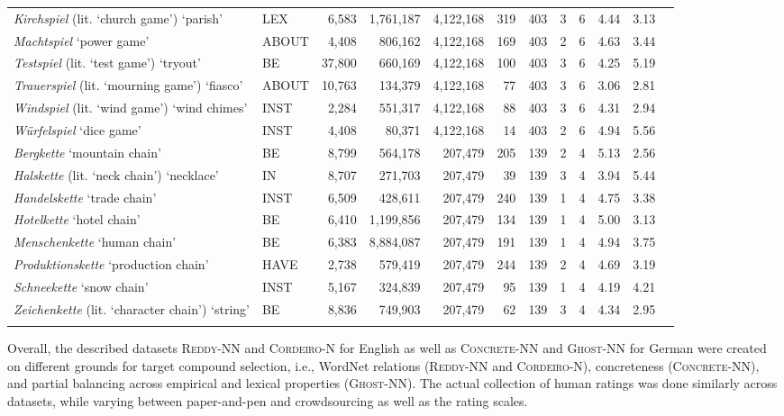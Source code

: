 \documentclass[output=paper,colorlinks,citecolor=brown]{langscibook}
\begin{document}
\begin{sidewaystable}
\begin{tabularx}{\textwidth}{llrrrrrrrrrr}
      \textit{Kirchspiel} (lit. `church game') `parish' & LEX & 6,583 & 1,761,187 & 4,122,168 & 319 & 403 & 3 & 6 & 4.44 & 3.13 \\
      \textit{Machtspiel} `power game' & ABOUT & 4,408 & 806,162 & 4,122,168 & 169 & 403 & 2 & 6 & 4.63 & 3.44 \\
      \textit{Testspiel} (lit. `test game') `tryout' & BE & 37,800 & 660,169 & 4,122,168 & 100 & 403 & 3 & 6 & 4.25 & 5.19 \\
      \textit{Trauerspiel} (lit. `mourning game') `fiasco' & ABOUT & 10,763 & 134,379 & 4,122,168 & 77 & 403 & 3 & 6 & 3.06 & 2.81 \\
      \textit{Windspiel} (lit. `wind game') `wind chimes' & INST & 2,284 & 551,317 & 4,122,168 & 88 & 403 & 3 & 6 & 4.31 & 2.94 \\
      \textit{Würfelspiel} `dice game' & INST & 4,408 & 80,371 & 4,122,168 & 14 & 403 & 2 & 6 & 4.94 & 5.56 \\
        \midrule

      \textit{Bergkette} `mountain chain' & BE & 8,799 & 564,178 & 207,479 & 205 & 139 & 2 & 4 & 5.13 & 2.56 \\
      \textit{Halskette} (lit. `neck chain') `necklace' & IN & 8,707 & 271,703 & 207,479 & 39 & 139 & 3 & 4 & 3.94 & 5.44 \\
      \textit{Handelskette} `trade chain' & INST & 6,509 & 428,611 & 207,479 & 240 & 139 & 1 & 4 & 4.75 & 3.38 \\
      \textit{Hotelkette} `hotel chain' & BE & 6,410 & 1,199,856 & 207,479 & 134 & 139 & 1 & 4 & 5.00 & 3.13 \\
      \textit{Menschenkette} `human chain' & BE & 6,383 & 8,884,087 & 207,479 & 191 & 139 & 1 & 4 & 4.94 & 3.75 \\
      \textit{Produktionskette} `production chain' & HAVE & 2,738 & 579,419 & 207,479 & 244 & 139 & 2 & 4 & 4.69 & 3.19 \\
      \textit{Schneekette} `snow chain' & INST & 5,167 & 324,839 & 207,479 & 95 & 139 & 1 & 4 & 4.19 & 4.21 \\
      \textit{Zeichenkette} (lit. `character chain') `string' & BE & 8,836 & 749,903 & 207,479 & 62 & 139 & 3 & 4 & 4.34 & 2.95 \\

\lspbottomrule
\end{tabularx}
\end{sidewaystable}

Overall, the described datasets \textsc{Reddy-NN} and \textsc{Cordeiro-N} for English as well as \textsc{Concrete-NN} and \textsc{Ghost-NN} for German were created on different grounds for target compound selection, i.e., WordNet relations (\textsc{Reddy-NN} and \textsc{Cordeiro-N}), concreteness (\textsc{Concrete-NN}), and partial balancing across empirical and lexical properties (\textsc{Ghost-NN}). The actual collection of human ratings was done similarly across datasets, while varying between paper-and-pen and crowdsourcing as well as the rating scales. 
\end{document}
